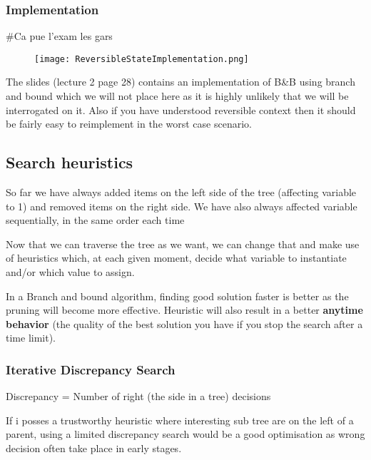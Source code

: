\subsubsection{Implementation}

\#Ca pue l'exam les gars

\begin{figure}[!ht]
    \centering
    \texttt{[image: ReversibleStateImplementation.png]}
    \label{fig:Knapsack_example}
\end{figure}
\FloatBarrier

The slides (lecture 2 page 28) contains an implementation of B\&B using branch and bound
which we will not place here as it is highly unlikely that we will be interrogated on it.
Also if you have understood reversible context then it should be fairly easy 
to reimplement in the worst case scenario.

\subsection{Search heuristics}

So far we have always added items on the left side of the tree (affecting variable to 1)
and removed items on the right side. We have also always affected variable sequentially, 
in the same order each time\newline

Now that we can traverse the tree as we want, we can change that and make use of 
heuristics which, at each given moment, decide what variable to instantiate 
and/or which value to assign. 
\newline

In a Branch and bound algorithm, finding good solution faster is better 
as the pruning will become more effective.
Heuristic will also result in a better \textbf{anytime behavior} (the quality of the best
solution you have if you stop the search after a time limit).  \newline

\subsubsection{Iterative Discrepancy Search}

Discrepancy = Number of right (the side in a tree) decisions

If i posses a trustworthy heuristic where interesting sub tree are on the left of a parent,
using a limited discrepancy search would be a good optimisation as wrong decision often
take place in early stages.

